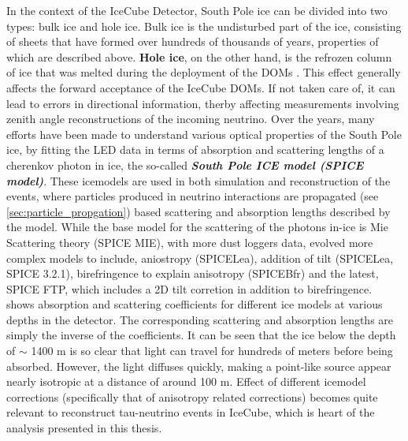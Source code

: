 In the context of the IceCube Detector, South Pole ice can be divided into two types: bulk ice and hole ice. Bulk ice is the undisturbed part of the ice, consisting of sheets that have formed over hundreds of thousands of years, properties of which are described above. \textbf{Hole ice}, on the other hand, is the refrozen column of ice that was melted during the deployment of the DOMs . This effect generally affects the forward acceptance of the IceCube DOMs. If not taken care of, it can lead to errors in directional information, therby affecting measurements involving zenith angle reconstructions of the incoming neutrino. Over the years, many efforts have been made to understand various optical properties of the South Pole ice, by fitting the LED data in terms of absorption and scattering lengths of a cherenkov photon in ice, the so-called \textbf{\emph{South Pole ICE model (SPICE model)}}. These icemodels are used in both simulation and reconstruction of the events, where particles produced in neutrino interactions are propagated (see \ref{sec:particle_propgation}) based scattering and absorption lengths described by the model. While the base model for the scattering of the photons in-ice is Mie Scattering theory \cite{miescattering} (SPICE MIE), with more dust loggers data, evolved more complex models to include, aniostropy (SPICELea), addition of tilt (SPICELea, SPICE 3.2.1), birefringence to explain anisotropy (SPICEBfr) and the latest, SPICE FTP, which includes a 2D tilt corretion in addition to birefringence.  shows absorption and scattering coefficients for different ice models at various depths in the detector. The corresponding scattering and absorption lengths are simply the inverse of the coefficients. It can be seen that the ice below the depth of $\sim$ 1400 m is so clear that light can travel for hundreds of meters before being absorbed. However, the light diffuses quickly, making a point-like source appear nearly isotropic at a distance of around 100 m. Effect of different icemodel corrections (specifically that of anisotropy related corrections) becomes quite relevant to reconstruct tau-neutrino events in IceCube, which is heart of the analysis presented in this thesis.


